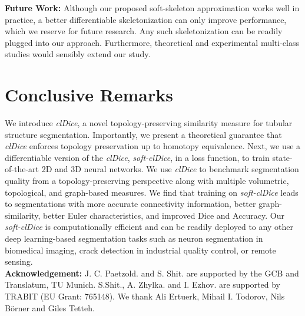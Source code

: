 \noindent\textbf{Future Work: }Although our proposed soft-skeleton approximation works well in practice, a better differentiable skeletonization can only improve performance, which we reserve for future research. Any such skeletonization can be readily plugged into our approach. Furthermore, theoretical and experimental multi-class studies would sensibly extend our study.

\section{Conclusive Remarks}
We introduce \textit{clDice}, a novel topology-preserving similarity measure for tubular structure segmentation. Importantly, we present a theoretical guarantee that \textit{clDice} enforces topology preservation up to homotopy equivalence. Next, we use a differentiable version of the \textit{clDice}, \textit{soft-clDice}, in a loss function, to train state-of-the-art 2D and 3D neural networks. We use \textit{clDice} to benchmark segmentation quality from a topology-preserving perspective along with multiple volumetric, topological, and graph-based measures.  We find that training on \textit{soft-clDice} leads to segmentations with more accurate connectivity information, better graph-similarity, better Euler characteristics, and improved Dice and Accuracy. Our \textit{soft-clDice} is computationally efficient and can be readily deployed to any other deep learning-based segmentation tasks such as neuron segmentation in biomedical imaging, crack detection in industrial quality control, or remote sensing.\\

\noindent \textbf{Acknowledgement: } J. C. Paetzold. and S. Shit. are supported by the GCB and Translatum, TU Munich. S.Shit., A. Zhylka. and I. Ezhov. are supported by TRABIT (EU Grant: 765148). We thank Ali Ertuerk, Mihail I. Todorov, Nils Börner and Giles Tetteh.



